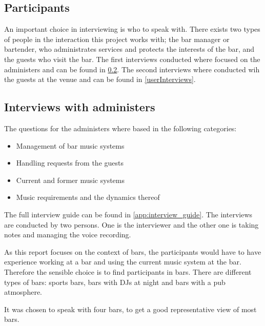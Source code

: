 \subsection{Participants}
An important choice in interviewing is who to speak with. There exists two types of people in the interaction this project works with; the bar manager or bartender, who administrates services and protects the interests of the bar, and the guests who visit the bar. The first interviews conducted where focused on the administers and can be found in \cref{sub:administersinterviews}. The second interviews where conducted wih the guests at the venue and can be found in \cref{userInterviews}.

\subsection{Interviews with administers}
\label{sub:administersinterviews}
The questions for the administers where based in the following categories:

\begin{itemize}
  \item Management of bar music systems
  \item Handling requests from the guests
  \item Current and former music systems
  \item Music requirements and the dynamics thereof
\end{itemize}

The full interview guide can be found in \cref{app:interview_guide}. The interviews are conducted by two persons. One is the interviewer and the other one is taking notes and managing the voice recording.

As this report focuses on the context of bars, the participants would have to have experience working at a bar and using the current music system at the bar. Therefore the sensible choice is to find participants in bars. There are different types of bars: sports bars, bars with DJs at night and bars with a pub atmosphere.

It was chosen to speak with four bars, to get a good representative view of most bars.


